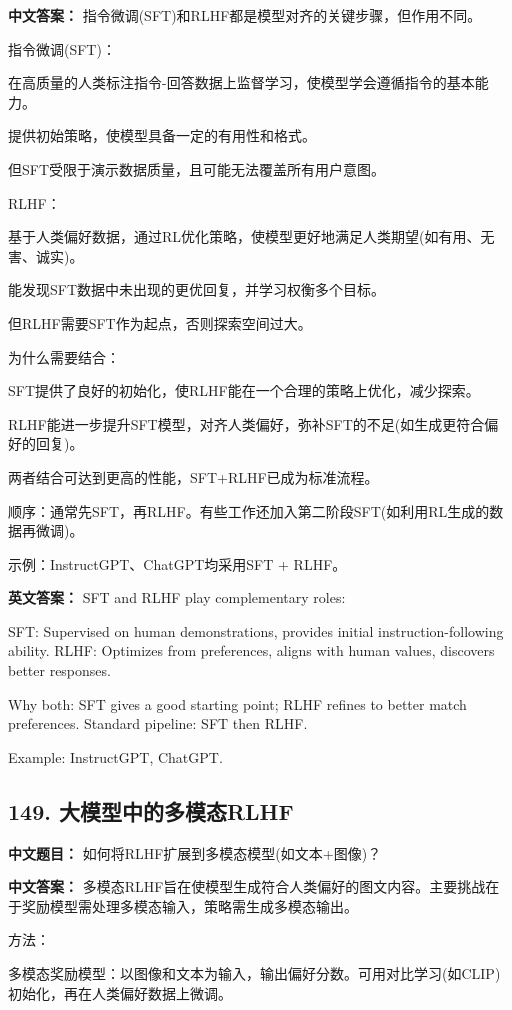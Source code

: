 \documentclass[10pt,a4paper]{ctexart}
\begin{document}
\textbf{中文答案：}
指令微调(SFT)和RLHF都是模型对齐的关键步骤，但作用不同。

指令微调(SFT)：

在高质量的人类标注指令-回答数据上监督学习，使模型学会遵循指令的基本能力。

提供初始策略，使模型具备一定的有用性和格式。

但SFT受限于演示数据质量，且可能无法覆盖所有用户意图。

RLHF：

基于人类偏好数据，通过RL优化策略，使模型更好地满足人类期望(如有用、无害、诚实)。

能发现SFT数据中未出现的更优回复，并学习权衡多个目标。

但RLHF需要SFT作为起点，否则探索空间过大。

为什么需要结合：

SFT提供了良好的初始化，使RLHF能在一个合理的策略上优化，减少探索。

RLHF能进一步提升SFT模型，对齐人类偏好，弥补SFT的不足(如生成更符合偏好的回复)。

两者结合可达到更高的性能，SFT+RLHF已成为标准流程。

顺序：通常先SFT，再RLHF。有些工作还加入第二阶段SFT(如利用RL生成的数据再微调)。

示例：InstructGPT、ChatGPT均采用SFT + RLHF。

\textbf{英文答案：}
SFT and RLHF play complementary roles:

SFT: Supervised on human demonstrations, provides initial instruction-following ability.
RLHF: Optimizes from preferences, aligns with human values, discovers better responses.

Why both: SFT gives a good starting point; RLHF refines to better match preferences. Standard pipeline: SFT then RLHF.

Example: InstructGPT, ChatGPT.

\subsection*{149. 大模型中的多模态RLHF}
\textbf{中文题目：} 如何将RLHF扩展到多模态模型(如文本+图像)？

\textbf{中文答案：}
多模态RLHF旨在使模型生成符合人类偏好的图文内容。主要挑战在于奖励模型需处理多模态输入，策略需生成多模态输出。

方法：

多模态奖励模型：以图像和文本为输入，输出偏好分数。可用对比学习(如CLIP)初始化，再在人类偏好数据上微调。
\end{document}
